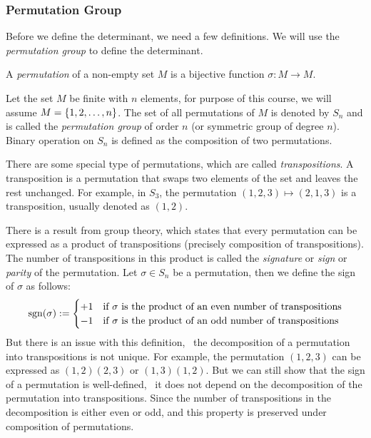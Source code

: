 \subsubsection{Permutation Group}

Before we define the determinant, we need a few definitions. We will use the \emph{permutation group} to define the determinant.
\begin{definition}
    A \emph{permutation} of a non-empty set \(M\) is a bijective function \(\sigma: M \to M\).

    Let the set \(M\) be finite with \(n\) elements, for purpose of this course, we will assume \(M = \qty{1, 2, \ldots, n}\). The set of all permutations of \(M\) is denoted by \(S_n\) and is called the \emph{permutation group} of order \(n\) (or symmetric group of degree \(n\)). Binary operation on \(S_n\) is defined as the composition of two permutations.
\end{definition}
There are some special type of permutations, which are called \emph{transpositions}. A transposition is a permutation that swaps two elements of the set and leaves the rest unchanged. For example, in \(S_3\), the permutation \((1, 2, 3) \mapsto (2, 1, 3)\) is a transposition, usually denoted as \((1, 2)\).

There is a result from group theory, which states that every permutation can be expressed as a product of transpositions (precisely composition of transpositions). The number of transpositions in this product is called the \emph{signature} or \emph{sign} or \emph{parity} of the permutation. Let \(\sigma \in S_n\) be a permutation, then we define the sign of \(\sigma\) as follows:
\begin{equation}
    \operatorname{sgn}(\sigma) := \begin{cases}
        +1 & \text{if } \sigma \text{ is the product of an even number of transpositions} \\
        -1 & \text{if } \sigma \text{ is the product of an odd number of transpositions}
    \end{cases}
\end{equation}
But there is an issue with this definition, \ie\ the decomposition of a permutation into transpositions is not unique. For example, the permutation \((1, 2, 3)\) can be expressed as \((1, 2)(2, 3)\) or \((1, 3)(1, 2)\). But we can still show that the sign of a permutation is well-defined, \ie\ it does not depend on the decomposition of the permutation into transpositions. Since the number of transpositions in the decomposition is either even or odd, and this property is preserved under composition of permutations.


